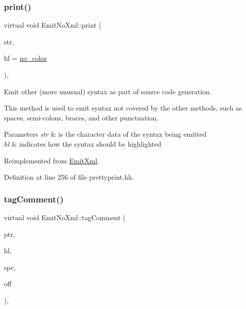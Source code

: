 \subsubsection{\texorpdfstring{print()}{print()}}
{\footnotesize\ttfamily virtual void Emit\+No\+Xml\+::print (\begin{DoxyParamCaption}\item[{const char $\ast$}]{str,  }\item[{\mbox{\hyperlink{class_emit_xml_a7c3577436da429c3c75f4b82cac6864f}{syntax\+\_\+highlight}}}]{hl = {\ttfamily \mbox{\hyperlink{class_emit_xml_a7c3577436da429c3c75f4b82cac6864facf637f33b975ebd31bda638a66d5b052}{no\+\_\+color}}} }\end{DoxyParamCaption})\hspace{0.3cm}{\ttfamily [inline]}, {\ttfamily [virtual]}}



Emit other (more unusual) syntax as part of source code generation. 

This method is used to emit syntax not covered by the other methods, such as spaces, semi-\/colons, braces, and other punctuation. 
\begin{DoxyParams}{Parameters}
{\em str} & is the character data of the syntax being emitted \\
\hline
{\em hl} & indicates how the syntax should be highlighted \\
\hline
\end{DoxyParams}


Reimplemented from \mbox{\hyperlink{class_emit_xml_a287234536199377d46179762127875ac}{Emit\+Xml}}.



Definition at line 256 of file prettyprint.\+hh.

\mbox{\label{class_emit_no_xml_a740eebfd037ace753caa1b98d23f3899}} 
\subsubsection{\texorpdfstring{tagComment()}{tagComment()}}
{\footnotesize\ttfamily virtual void Emit\+No\+Xml\+::tag\+Comment (\begin{DoxyParamCaption}\item[{const char $\ast$}]{ptr,  }\item[{\mbox{\hyperlink{class_emit_xml_a7c3577436da429c3c75f4b82cac6864f}{syntax\+\_\+highlight}}}]{hl,  }\item[{const \mbox{\hyperlink{class_addr_space}{Addr\+Space}} $\ast$}]{spc,  }\item[{\mbox{\hyperlink{types_8h_a2db313c5d32a12b01d26ac9b3bca178f}{uintb}}}]{off }\end{DoxyParamCaption})\hspace{0.3cm}{\ttfamily [inline]}, {\ttfamily [virtual]}}




